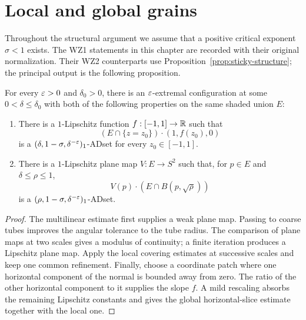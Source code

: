 \chapter{Local and global grains}
\label{chap:grains}

Throughout the structural argument we assume that a positive critical
exponent $\sigma<1$ exists. The WZ1 statements in this chapter are
recorded with their original normalization. Their WZ2 counterparts
use Proposition~\ref{prop:sticky-structure}; the principal output is
the following proposition.

\begin{proposition}
\label{prop:lipschitz-grains}
\leanok
{}
For every $\varepsilon>0$ and $\delta_0>0$, there is an $\varepsilon$-extremal
configuration at some $0<\delta\leq\delta_0$ with both of the
following properties on the same shaded union $E$:
\begin{enumerate}
\item There is a $1$-Lipschitz function $f:[-1,1]\to\mathbb{R}$ such that
\[
       (E\cap\{z=z_0\})\cdot(1,f(z_0),0)
\]
is a $(\delta,1-\sigma,\delta^{-\varepsilon})_1$-ADset for every
$z_0\in[-1,1]$.
\item There is a $1$-Lipschitz plane map $V:E\to S^2$ such that,
for $p\in E$ and $\delta\leq\rho\leq1$,
\[
       V(p)\cdot(E\cap B(p,\sqrt\rho))
\]
is a $(\rho,1-\sigma,\delta^{-\varepsilon})_1$-ADset.
\end{enumerate}
\end{proposition}
\begin{proof}
\leanok
The multilinear estimate first supplies a weak plane map. Passing to
coarse tubes improves the angular tolerance to the tube radius. The
comparison of plane maps at two scales gives a modulus of continuity;
a finite iteration produces a Lipschitz plane map. Apply the local
covering estimates at successive scales and keep one common
refinement. Finally, choose a coordinate patch where one horizontal
component of the normal is bounded away from zero. The ratio of the
other horizontal component to it supplies the slope $f$. A mild
rescaling absorbs the remaining Lipschitz constants and gives the
global horizontal-slice estimate together with the local one.
\end{proof}

